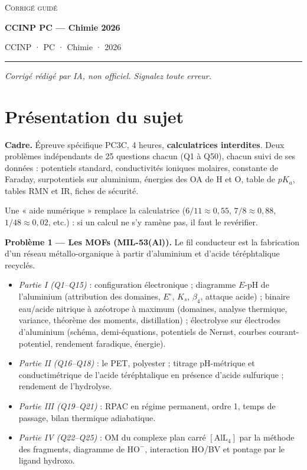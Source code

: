 \documentclass[11pt,a4paper]{article}
\providecommand{\tightlist}{\setlength{\itemsep}{0pt}\setlength{\parskip}{0pt}}
\begin{document}
\thispagestyle{plain}
\begin{center}
  {\small\scshape Corrigé guidé}\par\smallskip
  {\LARGE\bfseries CCINP PC — Chimie 2026\par}\medskip
  {\large CCINP · PC · Chimie · 2026\par}
\end{center}
\vspace{2pt}\hrule\vspace{8pt}

\emph{Corrigé rédigé par IA, non officiel. Signalez toute erreur.}

\hypertarget{pruxe9sentation-du-sujet}{%
\section{Présentation du sujet}\label{pruxe9sentation-du-sujet}}

\textbf{Cadre.} Épreuve spécifique PC3C, 4 heures, \textbf{calculatrices interdites}. Deux problèmes indépendants de 25 questions chacun (Q1 à Q50), chacun suivi de ses données : potentiels standard, conductivités ioniques molaires, constante de Faraday, surpotentiels sur aluminium, énergies des OA de H et O, table de \(pK_a\), tables RMN et IR, fiches de sécurité.

Une « aide numérique » remplace la calculatrice (\(6/11\approx0{,}55\), \(7/8\approx0{,}88\), \(1/48\approx0{,}02\), etc.) : si un calcul ne s'y ramène pas, il faut le revérifier.

\textbf{Problème 1 --- Les MOFs (MIL-53(Al)).} Le fil conducteur est la fabrication d'un réseau métallo-organique à partir d'aluminium et d'acide téréphtalique recyclés.

\begin{itemize}
\tightlist
\item
  \emph{Partie I (Q1--Q15)} : configuration électronique ; diagramme \(E\)-pH de l'aluminium (attribution des domaines, \(E^\circ\), \(K_s\), \(\beta_4\), attaque acide) ; binaire eau/acide nitrique à azéotrope à maximum (domaines, analyse thermique, variance, théorème des moments, distillation) ; électrolyse sur électrodes d'aluminium (schéma, demi-équations, potentiels de Nernst, courbes courant-potentiel, rendement faradique, énergie).
\item
  \emph{Partie II (Q16--Q18)} : le PET, polyester ; titrage pH-métrique et conductimétrique de l'acide téréphtalique en présence d'acide sulfurique ; rendement de l'hydrolyse.
\item
  \emph{Partie III (Q19--Q21)} : RPAC en régime permanent, ordre 1, temps de passage, bilan thermique adiabatique.
\item
  \emph{Partie IV (Q22--Q25)} : OM du complexe plan carré \([\mathrm{AlL_4}]\) par la méthode des fragments, diagramme de \(\mathrm{HO^-}\), interaction HO/BV et pontage par le ligand hydroxo.
\end{itemize}
\end{document}

